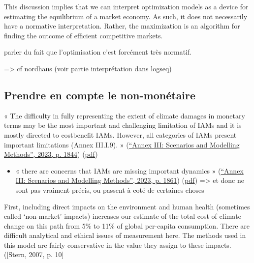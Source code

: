 \begin{displayquote}
    This discussion implies that we can interpret optimization models as a device for estimating the equilibrium of a market economy. As such, it does not necessarily have a normative interpretation. Rather, the maximization is an algorithm for finding the outcome of efficient competitive markets.
\end{displayquote}

\begin{tcolorbox}
    parler du fait que l'optimisation c'est forcément très normatif. 

    => cf nordhaus (voir partie interprétation dans logseq)
\end{tcolorbox}


\subsection{Prendre en compte le non-monétaire}


« The difficulty in fully representing the extent of climate damages in monetary terms may be the most important and challenging limitation of IAMs and it is mostly directed to costbenefit IAMs. However, all categories of IAMs present important limitations (Annex III.I.9). » (\href{zotero://select/library/items/2SDDNUUF}{“Annex III: Scenarios and Modelling Methods”, 2023, p. 1844}) (\href{zotero://open-pdf/library/items/CHVFSLLH?page=4&annotation=YT933ZM4}{pdf})
 

\begin{itemize}
    \item « there are concerns that IAMs are missing important dynamics » (\href{zotero://select/library/items/2SDDNUUF}{“Annex III: Scenarios and Modelling Methods”, 2023, p. 1861}) (\href{zotero://open-pdf/library/items/CHVFSLLH?page=21&annotation=WDMBNU3A}{pdf})
=> et donc ne sont pas vraiment précis, ou passent à coté de certaines choses

\end{itemize}

\begin{displayquote}
    First, including direct impacts on the environment and human health (sometimes called ‘non-market’ impacts) increases our estimate of the total cost of climate change on this path from 5\% to 11\% of global per-capita consumption. There are difficult analytical and ethical issues of measurement here. The methods used in this model are fairly conservative in the value they assign to these impacts.  ([Stern, 2007, p. 10]
\end{displayquote}

